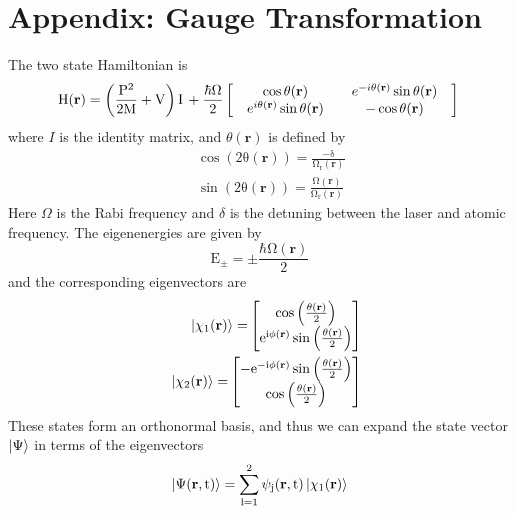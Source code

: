 \documentclass[twocolumn,english,pra,aps,superscriptaddress,floatfix]{revtex4-1}
\begin{document}
\section{Appendix: Gauge Transformation}
The two state Hamiltonian is
\begin{equation}
\mathrm{H(\mathbf{r})}=\mathrm{\left(\frac{P^2}{2M}+V\right)I \,+\frac{\hbar\Omega}{2}}
\begin{bmatrix}
&\cos{\theta(\mathbf{r})}& &e^{-i\theta(\mathbf{r})}\sin{\theta(\mathbf{r})}& \\
&e^{i\theta(\mathbf{r})}\sin{\theta(\mathbf{r})}& &-\cos{\theta(\mathbf{r})}&
\end{bmatrix} \\
\end{equation}
where $I$ is the identity matrix, and $\theta(\mathbf{r})$ is defined by
\begin{eqnarray}
&&\mathrm{\cos{\left(2\theta(\mathbf{r})\right)}=\frac{-\delta}{\Omega_r(\mathbf{r})}} \\
&&\mathrm{\sin{\left(2\theta(\mathbf{r})\right)}=\frac{\Omega(\mathbf{r})}{\Omega_r(\mathbf{r})}}
\end{eqnarray}
Here $\Omega$ is the Rabi frequency and $\delta$ is the detuning between the laser and atomic frequency.  The eigenenergies are given by
\begin{equation}
\mathrm{E_{\pm}=\pm\frac{\hbar\Omega(\mathbf{r})}{2}}
\end{equation}
and the corresponding eigenvectors are
\begin{eqnarray}
&&\mathrm{\ket{\chi_1(\mathbf{r})}=}
\begin{bmatrix}
\mathrm{\cos{\left(\frac{\theta(\mathbf{r})}{2}\right)} }\\
\mathrm{e^{i\phi(\mathbf{r})}\sin{\left(\frac{\theta(\mathbf{r})}{2}\right)}}
\end{bmatrix} \\
&&\mathrm{\ket{\chi_2(\mathbf{r})}=}
\begin{bmatrix}
\mathrm{-e^{-i\phi(\mathbf{r})}\sin{\left(\frac{\theta(\mathbf{r})}{2}\right)}}\\
\mathrm{\cos{\left(\frac{\theta(\mathbf{r})}{2}\right)} }
\end{bmatrix}
\end{eqnarray}
These states form an orthonormal basis, and thus we can expand the state vector $\ket{\Psi}$ in terms of the eigenvectors 
\begin{equation}
\mathrm{\ket{\Psi(\mathbf{r},t)}=\sum_{l=1}^2\psi_j(\mathbf{r},t)\ket{\chi_1(\mathbf{r})}}
\end{equation}
\end{document}
